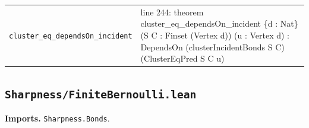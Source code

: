 \documentclass[10pt]{article}
\newcommand{\module}[1]{\texttt{#1}}
\begin{document}
\begin{longtable}{>{\raggedright\arraybackslash}p{} >{\raggedright\arraybackslash}p{}}
\texttt{cluster\_\allowbreak{}eq\_\allowbreak{}dependsOn\_\allowbreak{}incident} & {\ttfamily\scriptsize line 244:\allowbreak{} theorem cluster\_\allowbreak{}eq\_\allowbreak{}dependsOn\_\allowbreak{}incident \{d :\allowbreak{} Nat\} (\allowbreak{}S C :\allowbreak{} Finset (\allowbreak{}Vertex d)\allowbreak{})\allowbreak{} (\allowbreak{}u :\allowbreak{} Vertex d)\allowbreak{} :\allowbreak{} DependsOn (\allowbreak{}clusterIncidentBonds S C)\allowbreak{} (\allowbreak{}ClusterEqPred S C u)\allowbreak{}} \\[0.45em]
\end{longtable}

\subsection*{\module{Sharpness/FiniteBernoulli.lean}}
\textbf{Imports.} \module{Sharpness.Bonds}.
\end{document}
